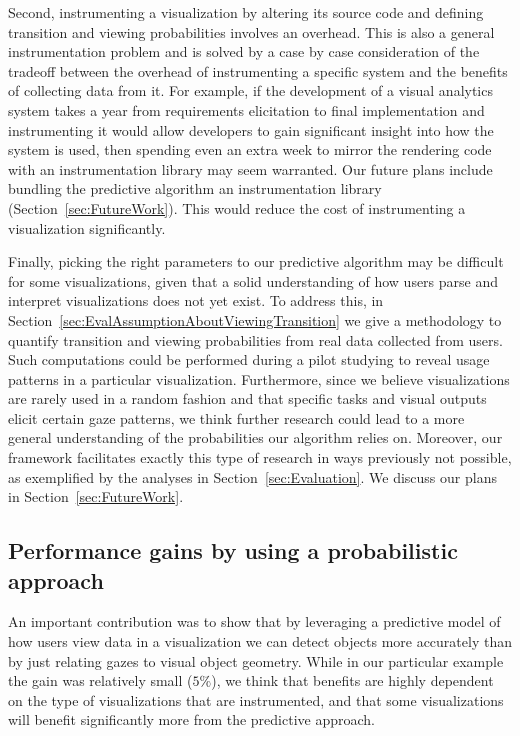Second, instrumenting a visualization by altering its source code and defining transition and viewing probabilities involves an overhead. This is also a general instrumentation problem and is solved by a case by case consideration of the tradeoff between the overhead of instrumenting a specific system and the benefits of collecting data from it. For example, if the development of a visual analytics system takes a year from requirements elicitation to final implementation and instrumenting it would allow developers to gain significant insight into how the system is used, then spending even an extra week to mirror the rendering code with an instrumentation library may seem warranted.  Our future plans include bundling the predictive algorithm an instrumentation library (Section~\ref{sec:FutureWork}). This would reduce the cost of instrumenting a visualization significantly. 



Finally, picking the right parameters to our predictive algorithm may be difficult for some visualizations, given that a solid understanding of how users parse and interpret visualizations does not yet exist. To address this, in Section~\ref{sec:EvalAssumptionAboutViewingTransition}  we give a methodology to quantify transition and viewing probabilities from real data collected from users. Such computations could be performed during a pilot studying to reveal usage patterns in a particular visualization. Furthermore, since we believe visualizations are rarely used in a random fashion and that specific tasks and visual outputs elicit certain gaze patterns, we think further research could lead to a more general understanding of the probabilities our algorithm relies on.  Moreover, our framework facilitates exactly this type of research in ways previously not possible, as exemplified by the analyses in Section~\ref{sec:Evaluation}. We discuss our plans in Section~\ref{sec:FutureWork}. 
 

\subsection{Performance gains by using a probabilistic approach}
An important contribution was to show that by leveraging a predictive model of how users view data in a visualization we can detect objects more accurately than by just relating gazes to visual object geometry. While in our particular example the gain was relatively small ($5\%$), we think that benefits are highly dependent on the type of visualizations that are instrumented, and that some visualizations will benefit significantly more from the predictive approach. 

